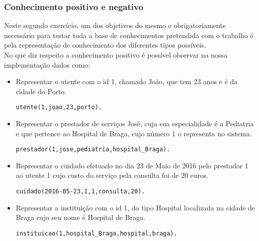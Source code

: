 \documentclass{article}
\begin{document}
\subsubsection{Conhecimento positivo e negativo}

Neste segundo exercício, um dos objetivos do mesmo e obrigatoriamente necessário para testar toda a base de conhecimentos pretendida com o trabalho é pela representação de conhecimento dos diferentes tipos possíveis.\\
No que diz respeito a conhecimento positivo é possível observar na nossa implementação dados como:

\begin{itemize}
	\item Representar o utente com o id 1, chamado João, que tem 23 anos e é da cidade do Porto.
\begin{verbatim}
utente(1,joao,23,porto).
\end{verbatim}
	\item Representar o prestador de serviços José, cuja sua especialidade é a Pediatria e que pertence ao Hospital de Braga, cujo número 1 o representa no sistema.
\begin{verbatim}
prestador(1,jose,pediatria,hospital_Braga).
\end{verbatim}
	\item Representar o cuidado efetuado no dia 23 de Maio de 2016 pelo prestador 1 ao utente 1 cujo custo do serviço pela consulta foi de 20 euros.
\begin{verbatim}
cuidado(2016-05-23,1,1,consulta,20).
\end{verbatim}
    \item Representar a instituição com o id 1, do tipo Hospital localizada na cidade de Braga cujo seu nome é Hospital de Braga.
\begin{verbatim}
instituicao(1,hospital_Braga,hospital,braga).
\end{verbatim}
\end{itemize}
\end{document}
